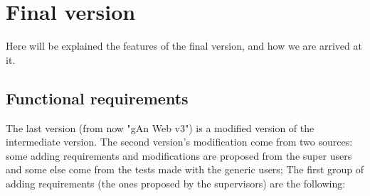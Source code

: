 
\chapter{Final version} %

\label{Chapter5} %

Here will be explained the features of the final version, and how we are arrived at it.

\section{Functional requirements}

The last version (from now "gAn Web v3") is a modified version of the intermediate version. 
The second version's modification come from two sources: some adding requirements and modifications are proposed from the super users and some else come from the tests made with the generic users; The first group of adding requirements (the ones proposed by the supervisors) are the following:

